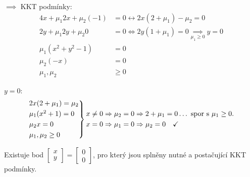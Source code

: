 $\implies$ KKT podmínky:
\begin{align*}
    4x + \mu_1 2 x + \mu_2 (-1) &= 0 \leftrightarrow 2x (2+\mu_1) - \mu_2 = 0 \\
    2y + \mu_1 2 y + \mu_2 0    &= 0 \Leftrightarrow 2y (1+\mu_1) = 0 \underset{\mu_1 \geq 0}{\implies} y = 0 \\
    \mu_1(x^2 + y^2 - 1) &= 0 \\
    \mu_2(-x) &= 0 \\
    \mu_1, \mu_2 &\geq 0  
\end{align*}

$y=0$:
\[
    \begin{rcases*}
        2x(2+ \mu_1) = \mu_2 \\
        \mu_1(x^2 + 1) = 0 \\
        \mu_2 x = 0 \\
        \mu_1, \mu_2 \geq 0
    \end{rcases*}
    \begin{aligned}
        &x \not= 0 \Rightarrow \mu_2 = 0 \Rightarrow 2 + \mu_1 = 0 \dots \text{ spor s } \mu_1 \geq 0.\\
        &x = 0 \Rightarrow \mu_1 = 0 \Rightarrow \mu_2 = 0 \quad \checkmark
    \end{aligned}
\]

Existuje bod $
\begin{bmatrix}
x \\
y    
\end{bmatrix} =
\begin{bmatrix}
    0 \\
    0
\end{bmatrix}$, pro který jsou splněny nutné a postačující KKT podmínky.

